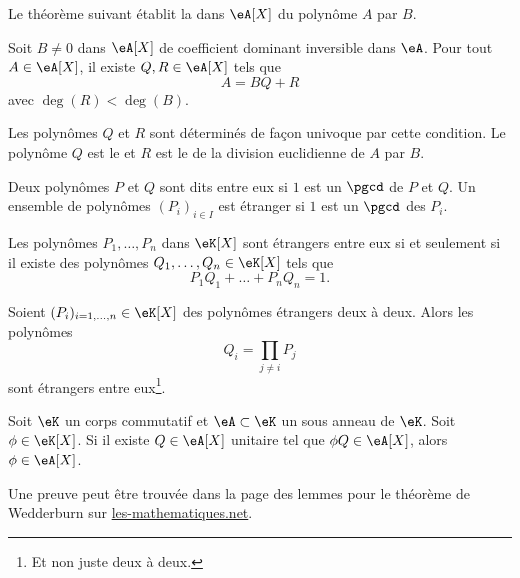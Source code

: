 Le théorème suivant établit la  dans \( \eA[X]\) du polynôme \( A\) par \( B\).
\begin{theorem}     \label{ThodivEuclPsFexf}
    Soit \( B\neq 0\) dans \( \eA[X]\) de coefficient dominant inversible dans \( \eA\). Pour tout \( A\in\eA[X]\), il existe \( Q,R\in \eA[X]\) tels que
    \begin{equation}
        A=BQ+R
    \end{equation}
    avec \( \deg(R)<\deg(B)\).

    Les polynômes \( Q\) et \( R\) sont déterminés de façon univoque par cette condition. Le polynôme \( Q\) est le  et \( R\) est le  de la division euclidienne de \( A\) par \( B\).
\end{theorem}

Deux polynômes \( P\) et \( Q\) sont dits  entre eux si \( 1\) est un \( \pgcd\) de \( P\) et \( Q\). Un ensemble de polynômes \( (P_i)_{i\in I}\) est étranger  si \( 1\) est un \( \pgcd\) des \( P_i\).

\begin{theorem}[Bezout] \label{ThoBezoutOuGmLB}
    Les polynômes \( P_1,\ldots,P_n\) dans \( \eK[X]\) sont étrangers entre eux si et seulement si il existe des polynômes \( Q_1,\ldots,Q_n\in\eK[X]\) tels que
    \begin{equation}
        P_1Q_1+\ldots+P_nQ_n=1.
    \end{equation}
\end{theorem}

\begin{lemma}       \label{LemuALZHn}
    Soient \( (P_i)_{i=1,\ldots,n}\in \eK[X]\) des polynômes étrangers deux à deux. Alors les polynômes \begin{equation} Q_i=\prod_{j\neq i}P_j \end{equation}
    sont étrangers entre eux\footnote{Et non juste deux à deux.}.
\end{lemma}

\begin{lemma}   \label{LemzwkYdn}
    Soit \( \eK\) un corps commutatif et \( \eA\subset \eK\) un sous anneau de \( \eK\). Soit \( \phi\in \eK[X]\). Si il existe \( Q\in \eA[X]\) unitaire tel que \( \phi Q\in \eA[X]\), alors \( \phi\in \eA[X]\).
\end{lemma}
Une preuve peut être trouvée dans la page des lemmes pour le théorème de Wedderburn sur \href{http://www.les-mathematiques.net/d/a/w/node5.php}{les-mathematiques.net}.

